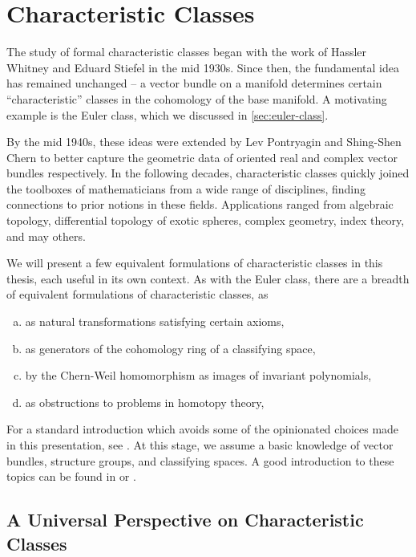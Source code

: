 \pagebreak
\section{Characteristic Classes}\label{sec:characteristic-classes}
The study of formal characteristic classes began with the work of Hassler Whitney and Eduard Stiefel in the mid 1930s. Since then, the fundamental idea has remained unchanged -- a vector bundle on a manifold determines certain ``characteristic'' classes in the cohomology of the base manifold. A motivating example is the Euler class, which we discussed in \cref{sec:euler-class}.


By the mid 1940s, these ideas were extended by Lev Pontryagin and Shing-Shen Chern to better capture the geometric data of oriented real and complex vector bundles respectively. In the following decades, characteristic classes quickly joined the toolboxes of mathematicians from a wide range of disciplines, finding connections to prior notions in these fields.
Applications ranged from algebraic topology, differential topology of exotic spheres, complex geometry, index theory, and may others.

We will present a few equivalent formulations of characteristic classes in this thesis, each useful in its own context. 
As with the Euler class, there are a breadth of equivalent formulations of characteristic classes, as
\begin{enumerate}[(a)]
	\item as natural transformations satisfying certain axioms,
	\item as generators of the cohomology ring of a classifying space,
	\item by the Chern-Weil homomorphism as images of invariant polynomials,
	\item as obstructions to problems in homotopy theory,
\end{enumerate}

For a standard introduction which avoids some of the opinionated choices made in this presentation, see \cite{milnorstasheff1974}.
At this stage, we assume a basic knowledge of vector bundles, structure groups, and classifying spaces. A good introduction to these topics can be found in \cite{botttu1982differential} or \cite{hatcher2003ktheory}.

\subsection{A Universal Perspective on Characteristic Classes}\label{sec:axiomatic-characteristic-classes}

